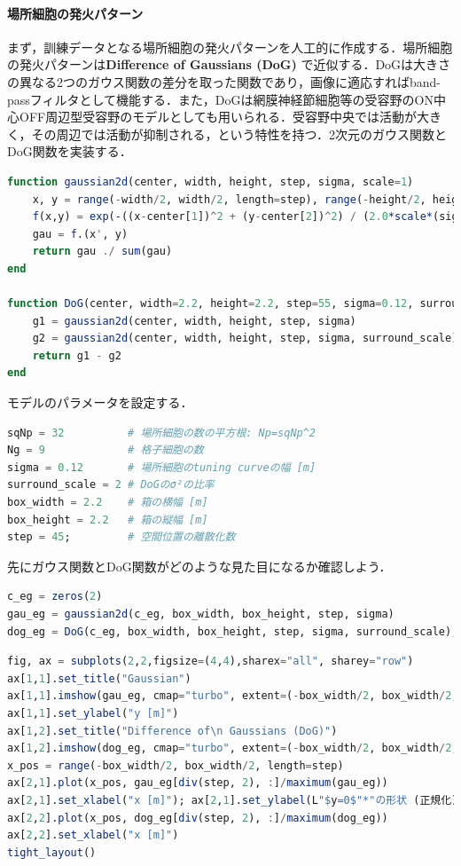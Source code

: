 \paragraph{場所細胞の発火パターン}
まず，訓練データとなる場所細胞の発火パターンを人工的に作成する．場所細胞の発火パターンは\textbf{Difference of Gaussians (DoG)} で近似する．DoGは大きさの異なる2つのガウス関数の差分を取った関数であり，画像に適応すればband-passフィルタとして機能する．また，DoGは網膜神経節細胞等の受容野のON中心OFF周辺型受容野のモデルとしても用いられる．受容野中央では活動が大きく，その周辺では活動が抑制される，という特性を持つ．2次元のガウス関数とDoG関数を実装する．
\begin{lstlisting}[language=julia]
function gaussian2d(center, width, height, step, sigma, scale=1)
    x, y = range(-width/2, width/2, length=step), range(-height/2, height/2, length=step)
    f(x,y) = exp(-((x-center[1])^2 + (y-center[2])^2) / (2.0*scale*(sigma^2)))
    gau = f.(x', y)
    return gau ./ sum(gau)
end

function DoG(center, width=2.2, height=2.2, step=55, sigma=0.12, surround_scale=2)
    g1 = gaussian2d(center, width, height, step, sigma)
    g2 = gaussian2d(center, width, height, step, sigma, surround_scale)
    return g1 - g2
end
\end{lstlisting}
モデルのパラメータを設定する．
\begin{lstlisting}[language=julia]
sqNp = 32          # 場所細胞の数の平方根: Np=sqNp^2
Ng = 9             # 格子細胞の数
sigma = 0.12       # 場所細胞のtuning curveの幅 [m]
surround_scale = 2 # DoGのσ²の比率
box_width = 2.2    # 箱の横幅 [m]
box_height = 2.2   # 箱の縦幅 [m]
step = 45;         # 空間位置の離散化数
\end{lstlisting}
先にガウス関数とDoG関数がどのような見た目になるか確認しよう．
\begin{lstlisting}[language=julia]
c_eg = zeros(2)
gau_eg = gaussian2d(c_eg, box_width, box_height, step, sigma)
dog_eg = DoG(c_eg, box_width, box_height, step, sigma, surround_scale);
\end{lstlisting}
\begin{lstlisting}[language=julia]
fig, ax = subplots(2,2,figsize=(4,4),sharex="all", sharey="row")
ax[1,1].set_title("Gaussian")
ax[1,1].imshow(gau_eg, cmap="turbo", extent=(-box_width/2, box_width/2, -box_height/2, box_height/2))
ax[1,1].set_ylabel("y [m]")
ax[1,2].set_title("Difference of\n Gaussians (DoG)")
ax[1,2].imshow(dog_eg, cmap="turbo", extent=(-box_width/2, box_width/2, -box_height/2, box_height/2))
x_pos = range(-box_width/2, box_width/2, length=step)
ax[2,1].plot(x_pos, gau_eg[div(step, 2), :]/maximum(gau_eg))
ax[2,1].set_xlabel("x [m]"); ax[2,1].set_ylabel(L"$y=0$"*"の形状 (正規化)")
ax[2,2].plot(x_pos, dog_eg[div(step, 2), :]/maximum(dog_eg))
ax[2,2].set_xlabel("x [m]")
tight_layout()
\end{lstlisting}
